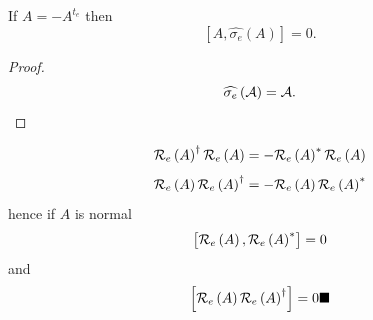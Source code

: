 \begin{corollary}
If $A=-A^{t_{e}}$ then 
\begin{equation}
\left[ A,\widehat{\sigma _{e}}\left( A\right) \right] =0.
\end{equation}

\begin{proof}
\begin{equation}
\widehat{\sigma _{e}}\left( {\cal A}\right) ={\cal A}.
\end{equation}
\end{proof}%
\begin{equation}
{\cal R}_{e}\left( A\right) ^{\dagger }{\cal R}_{e}\left( A\right) =-{\cal R}%
_{e}\left( A\right) ^{\ast }{\cal R}_{e}\left( A\right)
\end{equation}%
\begin{equation}
{\cal R}_{e}\left( A\right) {\cal R}_{e}\left( A\right) ^{\dagger }=-{\cal R}%
_{e}\left( A\right) {\cal R}_{e}\left( A\right) ^{\ast }
\end{equation}%
hence if $A$ is normal 
\begin{equation}
\left[ {\cal R}_{e}\left( A\right) ,{\cal R}_{e}\left( A\right) ^{\ast }%
\right] =0
\end{equation}%
and 
\begin{equation}
\left[ {\cal R}_{e}\left( A\right) {\cal R}_{e}\left( A\right) ^{\dagger }%
\right] =0\blacksquare
\end{equation}
\end{corollary}

